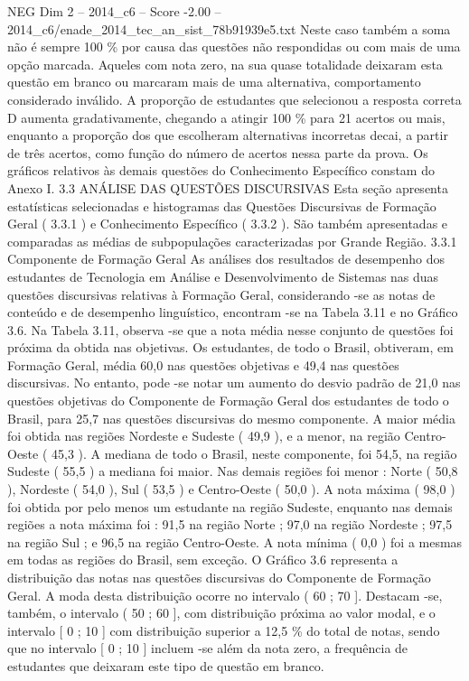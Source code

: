 \begin{textsample}{NEG Dim 2 – 2014\_c6 – Score -2.00 – 2014\_c6/enade\_2014\_tec\_an\_sist\_78b91939e5.txt}
Neste caso também a soma não é sempre 100 \% por causa das questões não respondidas ou com mais de uma opção marcada.
Aqueles com nota zero, na sua quase totalidade deixaram esta questão em branco ou marcaram mais de uma alternativa, comportamento considerado inválido.
A proporção de estudantes que selecionou a resposta correta D aumenta gradativamente, chegando a atingir 100 \% para 21 acertos ou mais, enquanto a proporção dos que escolheram alternativas incorretas decai, a partir de três acertos, como função do número de acertos nessa parte da prova.
Os gráficos relativos às demais questões do Conhecimento Específico constam do Anexo I. 3.3 ANÁLISE DAS QUESTÕES DISCURSIVAS Esta seção apresenta estatísticas selecionadas e histogramas das Questões Discursivas de Formação Geral ( 3.3.1 ) e Conhecimento Específico ( 3.3.2 ).
São também apresentadas e comparadas as médias de subpopulações caracterizadas por Grande Região. 3.3.1 Componente de Formação Geral As análises dos resultados de desempenho dos estudantes de Tecnologia em Análise e Desenvolvimento de Sistemas nas duas questões discursivas relativas à Formação Geral, considerando -se as notas de conteúdo e de desempenho linguístico, encontram -se na Tabela 3.11 e no Gráfico 3.6.
Na Tabela 3.11, observa -se que a nota média nesse conjunto de questões foi próxima da obtida nas objetivas.
Os estudantes, de todo o Brasil, obtiveram, em Formação Geral, média 60,0 nas questões objetivas e 49,4 nas questões discursivas.
No entanto, pode -se notar um aumento do desvio padrão de 21,0 nas questões objetivas do Componente de Formação Geral dos estudantes de todo o Brasil, para 25,7 nas questões discursivas do mesmo componente.
A maior média foi obtida nas regiões Nordeste e Sudeste ( 49,9 ), e a menor, na região Centro-Oeste ( 45,3 ).
A mediana de todo o Brasil, neste componente, foi 54,5, na região Sudeste ( 55,5 ) a mediana foi maior.
Nas demais regiões foi menor : Norte ( 50,8 ), Nordeste ( 54,0 ), Sul ( 53,5 ) e Centro-Oeste ( 50,0 ).
A nota máxima ( 98,0 ) foi obtida por pelo menos um estudante na região Sudeste, enquanto nas demais regiões a nota máxima foi : 91,5 na região Norte ; 97,0 na região Nordeste ; 97,5 na região Sul ; e 96,5 na região Centro-Oeste.
A nota mínima ( 0,0 ) foi a mesmas em todas as regiões do Brasil, sem exceção.
O Gráfico 3.6 representa a distribuição das notas nas questões discursivas do Componente de Formação Geral.
A moda desta distribuição ocorre no intervalo ( 60 ; 70 ].
Destacam -se, também, o intervalo ( 50 ; 60 ], com distribuição próxima ao valor modal, e o intervalo [ 0 ; 10 ] com distribuição superior a 12,5 \% do total de notas, sendo que no intervalo [ 0 ; 10 ] incluem -se além da nota zero, a frequência de estudantes que deixaram este tipo de questão em branco.

\end{textsample}
